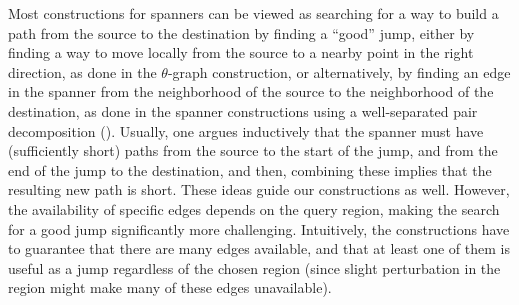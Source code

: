 Most constructions for spanners can be viewed as searching for a way
to build a path from the source to the destination by finding a
``good'' jump, either by finding a way to move locally from the source
to a nearby point in the right direction, as done in the
$\theta$-graph construction, or alternatively, by finding an edge in
the spanner from the neighborhood of the source to the neighborhood of
the destination, as done in the spanner constructions using a 
well-separated pair decomposition (\WSPD). Usually, one argues
inductively that the spanner must have (sufficiently short) paths from
the source to the start of the jump, and from the end of the jump to
the destination, and then, combining these implies that the resulting
new path is short.  These ideas guide our constructions as
well. However, the availability of specific edges depends on the query
region, making the search for a good jump significantly more
challenging. Intuitively, the constructions have to guarantee that
there are many edges available, and that at least one of them is
useful as a jump regardless of the chosen region (since slight
perturbation in the region might make many of these edges
unavailable).

